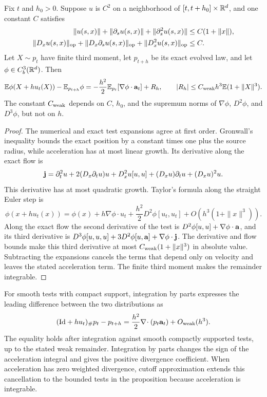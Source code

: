 \begin{proposition}
\label{prop:weak-euler}
Fix $t$ and $h_0>0$. Suppose $u$ is $C^2$ on a neighborhood of $[t,t+h_0]\times\mathbb R^d$, and one constant $C$ satisfies
\begin{align*}
 \|u(s,x)\|+\|\partial_su(s,x)\|+\|\partial_s^2u(s,x)\|&\le C(1+\|x\|),\\
 \|D_xu(s,x)\|_{\rm op}+\|D_x\partial_su(s,x)\|_{\rm op}+\|D_x^2u(s,x)\|_{\rm op}&\le C.
\end{align*}
Let $X\sim p_t$ have finite third moment, let $p_{t+h}$ be its exact evolved law, and let $\phi\in C_b^3(\mathbb R^d)$. Then
\[
 \mathbb E\phi(X+hu_t(X))-\mathbb E_{p_{t+h}}\phi
 =-\frac{h^2}{2}\mathbb E_{p_t}[\nabla\phi\cdot\mathbf a_t]+R_h,
 \qquad |R_h|\le C_{\rm weak}h^3\mathbb E(1+\|X\|^3).
\]
The constant $C_{\rm weak}$ depends on $C$, $h_0$, and the supremum norms of $\nabla\phi$, $D^2\phi$, and $D^3\phi$, but not on $h$.
\end{proposition}
\begin{proof}
The numerical and exact test expansions agree at first order. Gronwall's inequality bounds the exact position by a constant times one plus the source radius, while acceleration has at most linear growth. Its derivative along the exact flow is
\[
 \mathbf j=\partial_t^2u+2(D_x\partial_tu)u+D_x^2u[u,u]
 +(D_xu)\partial_tu+(D_xu)^2u.
\]
This derivative has at most quadratic growth. Taylor's formula along the straight Euler step is
\[
 \phi(x+hu_t(x))=\phi(x)+h\nabla\phi\cdot u_t
 +\frac{h^2}{2}D^2\phi[u_t,u_t]+O(h^3(1+\|x\|^3)).
\]
Along the exact flow the second derivative of the test is
$D^2\phi[u,u]+\nabla\phi\cdot\mathbf a$, and its third derivative is
$D^3\phi[u,u,u]+3D^2\phi[u,\mathbf a]+\nabla\phi\cdot\mathbf j$.
The derivative and flow bounds make this third derivative at most $C_{\rm weak}(1+\|x\|^3)$ in absolute value. Subtracting the expansions cancels the terms that depend only on velocity and leaves the stated acceleration term. The finite third moment makes the remainder integrable.
\end{proof}

For smooth tests with compact support, integration by parts expresses the leading difference between the two distributions as
\[
 (\mathrm{Id}+hu_t)_\#p_t-p_{t+h}
 =\frac{h^2}{2}\nabla\!\cdot(p_t\mathbf a_t)+O_{\mathrm{weak}}(h^3).
\]
The equality holds after integration against smooth compactly supported tests, up to the stated weak remainder. Integration by parts changes the sign of the acceleration integral and gives the positive divergence coefficient. When acceleration has zero weighted divergence, cutoff approximation extends this cancellation to the bounded tests in the proposition because acceleration is integrable.

